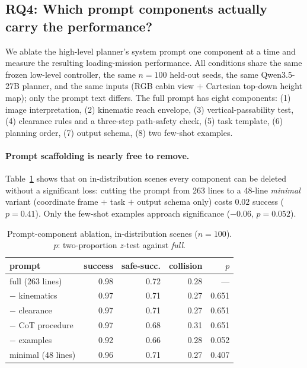 
\subsection{RQ4: Which prompt components actually carry the performance?}\label{subsec:rq4}

We ablate the high-level planner's system prompt one component at a time and measure the
resulting loading-mission performance. All conditions share the same frozen low-level controller,
the same $n{=}100$ held-out seeds, the same Qwen3.5-27B planner, and the same inputs
(RGB cabin view $+$ Cartesian top-down height map); only the prompt text differs.
The full prompt has eight components: (1) image interpretation, (2) kinematic reach envelope,
(3) vertical-passability test, (4) clearance rules and a three-step path-safety check,
(5) task template, (6) planning order, (7) output schema, (8) two few-shot examples.

\paragraph{Prompt scaffolding is nearly free to remove.}
Table~\ref{tab:rq4-id} shows that on in-distribution scenes every component can be deleted
without a significant loss: cutting the prompt from 263 lines to a 48-line \emph{minimal}
variant (coordinate frame $+$ task $+$ output schema only) costs $0.02$ success ($p{=}0.41$).
Only the few-shot examples approach significance ($-0.06$, $p{=}0.052$).

\begin{table}[t]\centering
\caption{Prompt-component ablation, in-distribution scenes ($n{=}100$).
$p$: two-proportion $z$-test against \emph{full}.}\label{tab:rq4-id}
\begin{tabular}{lrrrr}
\toprule
prompt & success & safe-succ. & collision & $p$ \\
\midrule
full (263 lines)      & 0.98 & 0.72 & 0.28 & --- \\
$-$ kinematics        & 0.97 & 0.71 & 0.27 & 0.651 \\
$-$ clearance         & 0.97 & 0.71 & 0.27 & 0.651 \\
$-$ CoT procedure     & 0.97 & 0.68 & 0.31 & 0.651 \\
$-$ examples          & 0.92 & 0.66 & 0.28 & 0.052 \\
minimal (48 lines)    & 0.96 & 0.71 & 0.27 & 0.407 \\
\bottomrule
\end{tabular}
\end{table}


